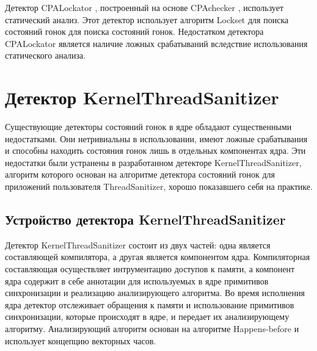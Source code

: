 Детектор CPALockator \cite{cpa-lockator}, построенный на основе CPAchecker \cite{cpachecker}, использует статический анализ.
Этот детектор использует алгоритм Lockset для поиска состояний гонок для поиска состояний гонок.
Недостатком детектора CPALockator является наличие ложных срабатываний вследствие использования статического анализа.


\section{Детектор KernelThreadSanitizer}

Существующие детекторы состояний гонок в ядре обладают существенными недостатками.
Они нетривиальны в использовании, имеют ложные срабатывания и способны находить состояния гонок лишь в отдельных компонентах ядра.
Эти недостатки были устранены в разработанном детекторе KernelThreadSanitizer, алгоритм которого основан на алгоритме детектора состояний гонок для приложений пользователя ThreadSanitizer, хорошо показавшего себя на практике.



\subsection{Устройство детектора KernelThreadSanitizer}

Детектор KernelThreadSanitizer состоит из двух частей: одна является составляющей компилятора, а другая является компонентом ядра.
Компиляторная составляющая осуществляет интрументацию доступов к памяти, а компонент ядра содержит в себе аннотации для используемых в ядре примитивов синхронизации и реализацию анализирующего алгоритма.
Во время исполнения ядра детектор отслеживает обращения к памяти и использование примитивов синхронизации, которые происходят в ядре, и передает их анализирующему алгоритму.
Анализирующий алгоритм основан на алгоритме Happens-before и использует концепцию векторных часов.


